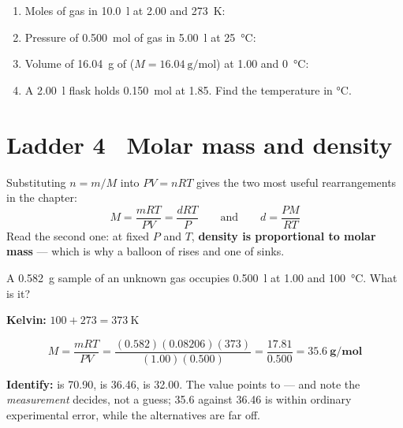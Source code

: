 \documentclass{apchem-worksheet}
\begin{document}
\begin{yourturn}
\begin{enumerate}[leftmargin=*,itemsep=0.5em]
  \item Moles of gas in \SI{10.0}{\litre} at \SI{2.00}{\atm} and
        \SI{273}{\kelvin}: \workspace[1.6cm]
  \item Pressure of \SI{0.500}{\mole} of gas in \SI{5.00}{\litre} at
        \SI{25}{\celsius}: \workspace[1.6cm]
  \item Volume of \SI{16.04}{\gram} of 
        ($M = \SI{16.04}{\gram\per\mole}$) at \SI{1.00}{\atm} and
        \SI{0}{\celsius}: \workspace[1.8cm]
  \item A \SI{2.00}{\litre} flask holds \SI{0.150}{\mole} at
        \SI{1.85}{\atm}. Find the temperature in \si{\celsius}.
        \workspace[1.8cm]
\end{enumerate}
\end{yourturn}

\section*{\sffamily Ladder 4 \textbullet\ Molar mass and density}

Substituting $n = m/M$ into $PV = nRT$ gives the two most useful
rearrangements in the chapter:
\[ M = \frac{mRT}{PV} = \frac{dRT}{P} \qquad\text{and}\qquad
   d = \frac{PM}{RT} \]
Read the second one: at fixed $P$ and $T$, \textbf{density is
proportional to molar mass} --- which is why a balloon of  rises
and one of  sinks.

\begin{workedexample}
A \SI{0.582}{\gram} sample of an unknown gas occupies
\SI{0.500}{\litre} at \SI{1.00}{\atm} and \SI{100}{\celsius}. What is it?

\textbf{Kelvin:} $100 + 273 = \SI{373}{\kelvin}$

\[ M = \frac{mRT}{PV} = \frac{(0.582)(0.08206)(373)}{(1.00)(0.500)}
     = \frac{17.81}{0.500} = \mathbf{35.6~g/mol} \]

\textbf{Identify:}  is 70.90,  is 36.46,  is
32.00. The value points to \textbf{} --- and note the
\emph{measurement} decides, not a guess; 35.6 against 36.46 is within
ordinary experimental error, while the alternatives are far off.
\end{workedexample}
\end{document}
